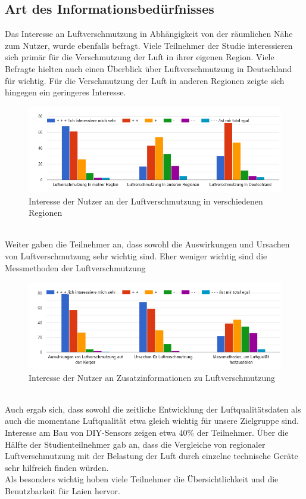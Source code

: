 \subsection{Art des Informationsbedürfnisses}
Das Interesse an \gls{Luftverschmutzung} in Abhängigkeit von der räumlichen Nähe zum Nutzer, wurde ebenfalls befragt.
Viele Teilnehmer der Studie interessieren sich primär für die Verschmutzung der Luft in ihrer eigenen Region. Viele Befragte hielten auch einen Überblick über \gls{Luftverschmutzung} in Deutschland für wichtig. Für die Verschmutzung der Luft in anderen Regionen zeigte sich hingegen ein geringeres Interesse.
\\
\begin{figure}[h]
    \centering
    \includegraphics[width=1\textwidth]{media/diagram/interesse.png}
    \caption{Interesse der Nutzer an der Luftverschmutzung in verschiedenen Regionen}
\end{figure}
\\
Weiter gaben die Teilnehmer an,  dass sowohl die Auswirkungen und Ursachen von \gls{Luftverschmutzung} sehr wichtig sind. Eher weniger wichtig sind die Messmethoden der Luftverschmutzung
\\
\begin{figure}[h]
    \centering
    \includegraphics[width=1\textwidth]{media/diagram/interesse2.png}
    \caption{Interesse der Nutzer an Zusatzinformationen zu Luftverschmutzung}
\end{figure}
\\
Auch ergab sich, dass sowohl die zeitliche Entwicklung der Luftqualitätsdaten als auch die momentane Luftqualität etwa gleich wichtig für unsere Zielgruppe sind. Interesse am Bau von \gls{DIY}-\glspl{Sensor} zeigen etwa 40\%  der Teilnehmer.
Über die Hälfte der Studienteilnehmer gab an, dass die Vergleiche von regionaler \gls{Luftverschmutzung} mit der Belastung der Luft durch einzelne technische Geräte sehr hilfreich finden würden.
\\
Als besonders wichtig hoben viele Teilnehmer die Übersichtlichkeit und die Benutzbarkeit für Laien hervor.

